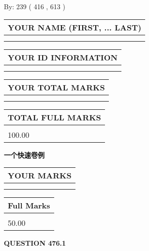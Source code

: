 \documentclass{ctexart}
\begin{document}
   
\hspace{1.0in} By: 
 239 ( 416 ,  613 )
   
   
   
   
\newpage 
\setcounter{page}{ 
   476001 } 
   
   
   
   
\noindent\begin{tabular}{|l|}
\hline
YOUR NAME (FIRST, ... LAST)  \\
\hline
 \\ 
 \\ 
\hline
\end{tabular}
\hspace{0.05in} \begin{tabular}{|l|}
\hline
 YOUR   ID   INFORMATION  \\
\hline
 \\ 
 \\ 
\hline
\end{tabular}
   
   
\vspace{0.2in}\noindent\begin{tabular}{|l|}
\hline
YOUR TOTAL MARKS  \\
\hline
 \\ 
 \\ 
\hline
\end{tabular}
\hspace{0.05in} \begin{tabular}{|l|}
\hline
TOTAL FULL MARKS  \\
\hline
 \\ 
100.00 \\
\hline
\end{tabular}
   
   
 \vspace{0.2in}
{\LARGE {\textbf{ 一个快速卷例}}}
   
   
  
\vspace{0.2in}
  
\noindent\begin{tabular}{|l|}
\hline
 YOUR MARKS  \\
\hline
 \\ 
 \\ 
\hline
\end{tabular}
\hspace{0.05in} \begin{tabular}{|l|}
\hline
 Full Marks  \\
\hline
 \\ 
50.00 \\
\hline
\end{tabular}
{\textbf{\Large{QUESTION
476.1 
}}}
  
\end{document}
